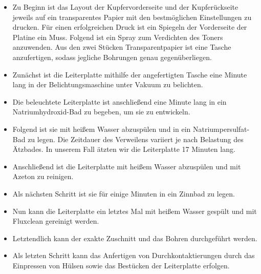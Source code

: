 \begin{itemize}
    \item Zu Beginn ist das Layout der Kupfervorderseite und der Kupferückseite jeweils auf ein transparentes Papier mit den bestmöglichen Einstellungen zu drucken.
    Für einen erfolgreichen Druck ist ein Spiegeln der Vorderseite der Platine ein Muss.
    Folgend ist ein Spray zum Verdichten des Toners anzuwenden.
    Aus den zwei Stücken Transparentpapier ist eine Tasche anzufertigen, sodass jegliche Bohrungen genau gegenüberliegen. \\

    \item Zunächst ist die Leiterplatte mithilfe der angefertigten Tasche eine Minute lang in der Belichtungsmaschine unter Vakuum zu belichten. \\

    \item Die beleuchtete Leiterplatte ist anschließend eine Minute lang in ein Natriumhydroxid-Bad zu begeben, um sie zu entwickeln. \\

    \item Folgend ist sie mit heißem Wasser abzuspülen und in ein Natriumpersulfat-Bad zu legen.
    Die Zeitdauer des Verweilens variiert je nach Belastung des Ätzbades.
    In unserem Fall ätzten wir die Leiterplatte 17 Minuten lang. \\

    \item Anschließend ist die Leiterplatte mit heißem Wasser abzuspülen und mit Azeton zu reinigen. \\

    \item Als nächsten Schritt ist sie für einige Minuten in ein Zinnbad zu legen. \\

    \item Nun kann die Leiterplatte ein letztes Mal mit heißem Wasser gespült und mit Fluxclean gereinigt werden.

    \item Letztendlich kann der exakte Zuschnitt und das Bohren durchgeführt werden. \\

    \item Als letzten Schritt kann das Anfertigen von Durchkontaktierungen durch das Einpressen von Hülsen sowie das Bestücken der Leiterplatte erfolgen.
\end{itemize}

